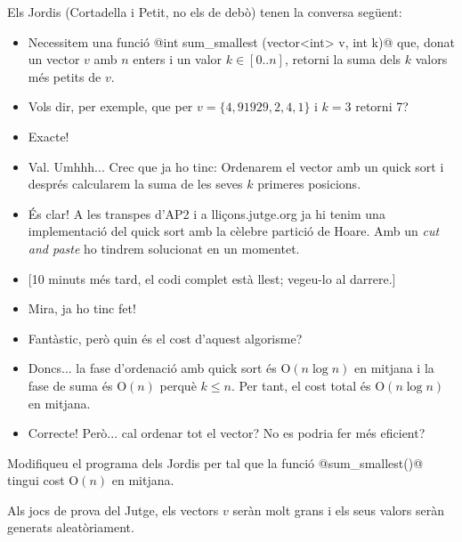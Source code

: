 

\Statement


Els Jordis (Cortadella i Petit, no els de debò) tenen la conversa següent:

\begin{itemize}

\item[---] Necessitem una funció @int sum_smallest (vector<int> v, int k)@
que, donat un vector $v$ amb $n$ enters i un valor $k\in[0..n]$,
retorni la suma dels $k$ valors més petits de $v$.

\item[---] Vols dir, per exemple, que per $v=\{4,91929,2,4,1\}$ i $k=3$ retorni 7?

\item[---] Exacte!

\item[---] Val. Umhhh... Crec que ja ho tinc: Ordenarem el vector amb un quick sort
i després calcularem la suma de les seves $k$ primeres posicions.

\item[---] És clar! A les transpes d'AP2 i a \textsf{\small lliçons.jutge.org} ja hi tenim una
implementació del  quick sort amb la cèlebre partició de Hoare. Amb un
\emph{cut and paste} ho tindrem solucionat en un momentet.

\item[] \hspace*{-1cm}[10 minuts més tard, el codi complet està llest; vegeu-lo al darrere.]

\item[---] Mira, ja ho tinc fet!

\item[---] Fantàstic, però quin és el cost d'aquest algorisme?

\item[---] Doncs... la fase d'ordenació amb quick sort és $\text{O}(n\log n)$ en mitjana
i la fase de suma és $\text{O}(n)$ perquè $k\le n$. Per tant, el cost total és $\text{O}(n\log n)$ en mitjana.

\item[---] Correcte! Però... cal ordenar tot el vector? No es podria fer més eficient?

\end{itemize}

Modifiqueu el programa dels Jordis per tal que la funció @sum_smallest()@
tingui cost $\text{O}(n)$ en mitjana.




\ObservationNoMain

\medskip
Als jocs de prova del Jutge, els vectors $v$ seràn molt grans i els seus valors seràn
generats aleatòriament.


\clearpage
{\small

}

\clearpage

